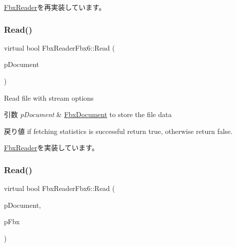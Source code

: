 \hyperlink{class_fbx_reader_aa026634b699bea0df1b43850c08bb63a}{Fbx\+Reader}を再実装しています。

\mbox{\label{class_fbx_reader_fbx6_ab16aeaede33ca635a0493069aac4fbea}} 
\subsubsection{\texorpdfstring{Read()}{Read()}\hspace{0.1cm}{\footnotesize\ttfamily [1/2]}}
{\footnotesize\ttfamily virtual bool Fbx\+Reader\+Fbx6\+::\+Read (\begin{DoxyParamCaption}\item[{\hyperlink{class_fbx_document}{Fbx\+Document} $\ast$}]{p\+Document }\end{DoxyParamCaption})\hspace{0.3cm}{\ttfamily [virtual]}}

Read file with stream options 
\begin{DoxyParams}{引数}
{\em p\+Document} & \hyperlink{class_fbx_document}{Fbx\+Document} to store the file data \\
\hline
\end{DoxyParams}
\begin{DoxyReturn}{戻り値}
if fetching statistics is successful return {\ttfamily true}, otherwise return {\ttfamily false}. 
\end{DoxyReturn}


\hyperlink{class_fbx_reader_a29941746acc73d7ffd2411a9be9d2525}{Fbx\+Reader}を実装しています。

\mbox{\label{class_fbx_reader_fbx6_aaf4d83d83558463da215d522cb1c4503}} 
\subsubsection{\texorpdfstring{Read()}{Read()}\hspace{0.1cm}{\footnotesize\ttfamily [2/2]}}
{\footnotesize\ttfamily virtual bool Fbx\+Reader\+Fbx6\+::\+Read (\begin{DoxyParamCaption}\item[{\hyperlink{class_fbx_document}{Fbx\+Document} $\ast$}]{p\+Document,  }\item[{\hyperlink{class_fbx_i_o}{Fbx\+IO} $\ast$}]{p\+Fbx }\end{DoxyParamCaption})\hspace{0.3cm}{\ttfamily [virtual]}}

